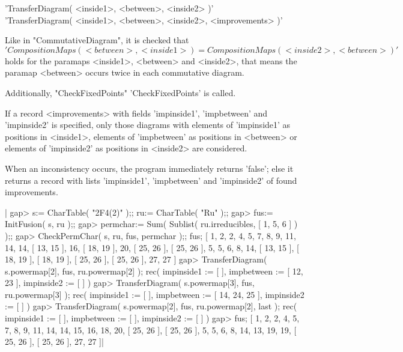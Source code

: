 
'TransferDiagram( <inside1>, <between>, <inside2> )'\\
'TransferDiagram( <inside1>, <between>, <inside2>, <improvements> )'

Like in "CommutativeDiagram", it is checked that
\[ 'CompositionMaps( <between>, <inside1> ) =
    CompositionMaps( <inside2>, <between> )' \]
holds for the paramaps <inside1>, <between> and <inside2>,
that means the paramap <between> occurs twice in each commutative diagram.

Additionally, "CheckFixedPoints" 'CheckFixedPoints' is called.

If a record <improvements> with fields 'impinside1', 'impbetween' and
'impinside2' is specified, only those diagrams with elements of
'impinside1' as positions in <inside1>, elements of 'impbetween' as
positions in <between> or elements of 'impinside2' as positions in
<inside2> are considered.

When an inconsistency occurs, the program immediately returns 'false';
else it returns a record with lists 'impinside1', 'impbetween' and
'impinside2' of found improvements.

|    gap> s:= CharTable( "2F4(2)" );; ru:= CharTable( "Ru" );;
    gap> fus:= InitFusion( s, ru );;
    gap> permchar:= Sum( Sublist( ru.irreducibles, [ 1, 5, 6 ] ) );;
    gap> CheckPermChar( s, ru, fus, permchar );; fus;
    [ 1, 2, 2, 4, 5, 7, 8, 9, 11, 14, 14, [ 13, 15 ], 16, [ 18, 19 ], 20, 
      [ 25, 26 ], [ 25, 26 ], 5, 5, 6, 8, 14, [ 13, 15 ], [ 18, 19 ],
      [ 18, 19 ], [ 25, 26 ], [ 25, 26 ], 27, 27 ]
    gap> TransferDiagram( s.powermap[2], fus, ru.powermap[2] );
    rec(
      impinside1 := [  ],
      impbetween := [ 12, 23 ],
      impinside2 := [  ] )
    gap> TransferDiagram( s.powermap[3], fus, ru.powermap[3] );
    rec( 
      impinside1 := [  ], 
      impbetween := [ 14, 24, 25 ], 
      impinside2 := [  ] )
    gap> TransferDiagram( s.powermap[2], fus, ru.powermap[2], last );
    rec( 
      impinside1 := [  ], 
      impbetween := [  ], 
      impinside2 := [  ] )
    gap> fus;
    [ 1, 2, 2, 4, 5, 7, 8, 9, 11, 14, 14, 15, 16, 18, 20, [ 25, 26 ],
      [ 25, 26 ], 5, 5, 6, 8, 14, 13, 19, 19, [ 25, 26 ], [ 25, 26 ], 27,
      27 ]|


